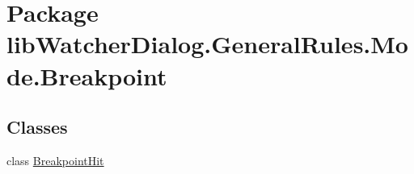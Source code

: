 \hypertarget{namespacelib_watcher_dialog_1_1_general_rules_1_1_mode_1_1_breakpoint}{\section{Package lib\+Watcher\+Dialog.\+General\+Rules.\+Mode.\+Breakpoint}
\label{namespacelib_watcher_dialog_1_1_general_rules_1_1_mode_1_1_breakpoint}
}
\subsection*{Classes}
\begin{DoxyCompactItemize}
\item 
class \hyperlink{classlib_watcher_dialog_1_1_general_rules_1_1_mode_1_1_breakpoint_1_1_breakpoint_hit}{Breakpoint\+Hit}
\end{DoxyCompactItemize}
